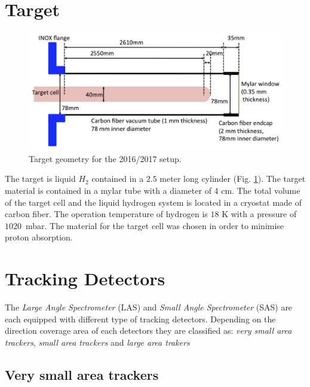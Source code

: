 
\section{Target}

\begin{figure}[!h]
  \centering
	\includegraphics[scale=0.3]{./gfx/Target.png}
	\caption{Target geometry for the 2016/2017 setup.}
	\label{pic:TargetSetup}
\end{figure}

The target is liquid $H_2$ contained in a $2.5$ meter long cylinder (Fig. \ref{pic:TargetSetup}). The target material is contained in a mylar tube with a diameter of $4$ cm. The total volume of the target cell and the liquid hydrogen system is located in a cryostat made of carbon fiber. The operation temperature of hydrogen is $18$ K with a pressure of $1020$~mbar. The material for the target cell was chosen in order to minimise proton absorption.


\section{Tracking Detectors}\label{sec:track}

The \textit{Large Angle Spectrometer} (LAS) and \textit{Small Angle Spectrometer} (SAS) are each equipped with different type of tracking detectors. Depending on the direction coverage area of each detectors they are classified as:
\textit{very small area trackers}, \textit{small area trackers} and \textit{large area trakers}

\subsection{Very small area trackers}

